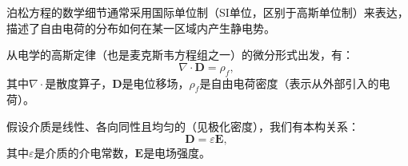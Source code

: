 泊松方程的数学细节通常采用国际单位制（SI单位，区别于高斯单位制）来表达，描述了自由电荷的分布如何在某一区域内产生静电势。

从电学的高斯定律（也是麦克斯韦方程组之一）的微分形式出发，有：
\[
\nabla \cdot \mathbf{D} = \rho_f,~
\]
其中\(\nabla \cdot\)是散度算子，\(\mathbf{D}\)是电位移场，\(\rho_f\)是自由电荷密度（表示从外部引入的电荷）。

假设介质是线性、各向同性且均匀的（见极化密度），我们有本构关系：
\[
\mathbf{D} = \varepsilon \mathbf{E},~
\]
其中\(\varepsilon\)是介质的介电常数，\(\mathbf{E}\)是电场强度。